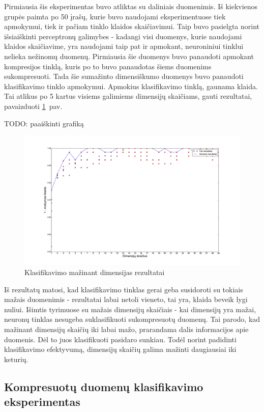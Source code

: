 \documentclass{VUMIFPSbakalaurinis}
\newcommand{\TODO}[1]{
\colorbox{todo-background-color}{TODO: #1}
}
\begin{document}
Pirmiausia šis eksperimentas buvo atliktas su daliniais duomenimis.
Iš kiekvienos grupės paimta po 50 įrašų, kurie buvo naudojami eksperimentuose tiek apmokymui, tiek ir pačiam tinklo klaidos skaičiavimui.
Taip buvo pasielgta norint išsiaiškinti perceptronų galimybes - kadangi visi duomenys, kurie naudojami klaidos skaičiavime, yra naudojami taip pat ir apmokant, neuroniniui tinklui nelieka nežinomų duomenų.
Pirmiausia šie duomenys buvo panaudoti apmokant kompresijos tinklą, kuris po to buvo panaudotas šiems duomenims sukompresuoti.
Tada šie sumažinto dimensiškumo duomenys buvo panaudoti klasifikavimo tinklo apmokymui.
Apmokius klasifikavimo tinklą, gaunama klaida.
Tai atlikus po 5 kartus visiems galimiems dimensijų skaičiams, gauti rezultatai, pavaizduoti \ref{fig:experiment-1}~pav.

\TODO{paaiškinti grafiką}

\begin{figure}
	\includegraphics[scale=0.32]{pics/dimensions_2015-5-23_15-50-6}
	\caption{Klasifikavimo mažinant dimensijas rezultatai}
	\label{fig:experiment-1}
\end{figure}

Iš rezultatų matosi, kad klasifikavimo tinklas gerai geba susidoroti su tokiais mažais duomenimis - rezultatai labai netoli vieneto, tai yra, klaida beveik lygi nuliui.
Išimtis tyrimuose su mažais dimensijų skaičiais - kai dimensijų yra mažai, neuronų tinklas nesugeba suklasifikuoti sukompresuotų duomenų.
Tai parodo, kad mažinant dimensijų skaičių iki labai mažo, prarandama dalis informacijos apie duomenis.
Dėl to juos klasifikuoti pasidaro sunkiau.
Todėl norint padidinti klasifikavimo efektyvumą, dimensijų skaičių galima mažinti daugiausiai iki keturių.


\subsection{Kompresuotų duomenų klasifikavimo eksperimentas}
\end{document}
